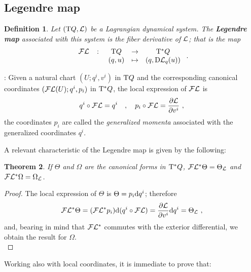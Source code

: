 \documentclass[12pt]{report}
\newtheorem{teor}{Theorem}[chapter]
\newtheorem{definition}[teor]{Definition}
\def\derpar#1#2{\frac{\partial{#1}}{\partial{#2}}}
\def\qed{\ifvmode\removelastskip\fi
{\unskip\nobreak\hfil\penalty50\hbox{}\nobreak\hfil
\hbox{\vrule height1.2ex width1.2ex}\parfillskip=0pt
\finalhyphendemerits=0 \par\smallskip}}
\def\Lag{{\cal L}}
\def\d{{\rm d}}
\def\Tan{{\rm T}}
\def\Leg{{\cal F}\Lag}
\begin{document}
\subsection{Legendre map}


\begin{definition}
Let $(\Tan Q,\Lag )$ be a Lagrangian dynamical system.
The \textbf{Legendre map} associated with this system
is the fiber derivative of $\Lag$; that is the map
$$
\begin{array}{ccccc}
\Leg & \colon & \Tan Q & \to & \Tan^*Q
\\
 & & (q,u) & \mapsto & (q,{\rm D}\Lag_q(u))
\end{array} \ .
$$
\end{definition}

:
Given a natural chart $(U;q^i,v^i)$ in $\Tan Q$
and the corresponding canonical coordinates
$(\Leg(U);q^i,p_i)$ in $\Tan^* Q$,
the local expression of $\Leg$ is
$$
q^i \circ \Leg = q^i \quad , \quad p_i \circ \Leg =\derpar{\Lag}{v^i} \ ,
$$
the coordinates $p_i$ are called the
{\sl generalized momenta} associated with the generalized coordinates $q^i$.

A relevant characteristic of the Legendre map is given by the following:

\begin{teor}
If $\Theta$ and $\Omega$ are the canonical forms in $\Tan^*Q$,
$\Leg^*\Theta =\Theta_\Lag$ and $\Leg^*\Omega =\Omega_\Lag$.
\end{teor}
\begin{proof}
The local expression of $\Theta$ is $\Theta =p_i\d q^i$; therefore
$$
\Leg^*\Theta = (\Leg^*p_i)\d (q^i\circ\Leg ) =
\derpar{\Lag}{v^i}\d q^i = \Theta_\Lag \ ,
$$
and, bearing in mind that $\Leg^*$ commutes with the exterior differential,
we obtain the result for $\Omega$.
\\ \qed \end{proof}

Working also with local coordinates, it is immediate to prove that:
\end{document}
